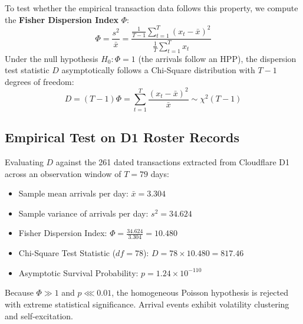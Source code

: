 \documentclass[11pt,a4paper]{article}
\begin{document}
To test whether the empirical transaction data follows this property, we compute the \textbf{Fisher Dispersion Index} $\Phi$:
\begin{equation}
\Phi = \frac{s^2}{\bar{x}} = \frac{\frac{1}{T-1} \sum_{t=1}^T (x_t - \bar{x})^2}{\frac{1}{T} \sum_{t=1}^T x_t}
\end{equation}
Under the null hypothesis $H_0: \Phi = 1$ (the arrivals follow an HPP), the dispersion test statistic $D$ asymptotically follows a Chi-Square distribution with $T - 1$ degrees of freedom:
\begin{equation}
D = (T - 1) \Phi = \sum_{t=1}^T \frac{(x_t - \bar{x})^2}{\bar{x}} \sim \chi^2(T - 1)
\end{equation}

\subsection{Empirical Test on D1 Roster Records}
Evaluating $D$ against the 261 dated transactions extracted from Cloudflare D1 across an observation window of $T = 79$ days:
\begin{itemize}[leftmargin=1.5em]
    \item Sample mean arrivals per day: $\bar{x} = 3.304$
    \item Sample variance of arrivals per day: $s^2 = 34.624$
    \item Fisher Dispersion Index: $\Phi = \frac{34.624}{3.304} = \mathbf{10.480}$
    \item Chi-Square Test Statistic ($df = 78$): $D = 78 \times 10.480 = \mathbf{817.46}$
    \item Asymptotic Survival Probability: $p = 1.24 \times 10^{-110}$
\end{itemize}

Because $\Phi \gg 1$ and $p \lll 0.01$, the homogeneous Poisson hypothesis is rejected with extreme statistical significance. Arrival events exhibit volatility clustering and self-excitation.
\end{document}
